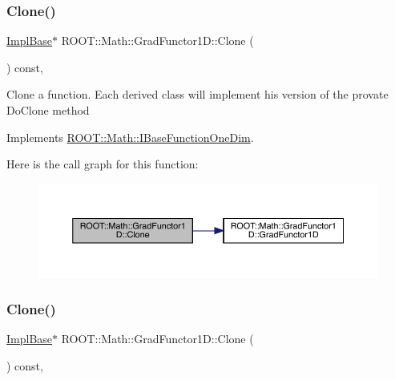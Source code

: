 \subsubsection{\texorpdfstring{Clone()}{Clone()}\hspace{0.1cm}{\footnotesize\ttfamily [1/3]}}
{\footnotesize\ttfamily \mbox{\hyperlink{classROOT_1_1Math_1_1GradFunctor1D_a16b436a0d100aa6c16ee66961c4f5b97}{Impl\+Base}}$\ast$ R\+O\+O\+T\+::\+Math\+::\+Grad\+Functor1\+D\+::\+Clone (\begin{DoxyParamCaption}{ }\end{DoxyParamCaption}) const\hspace{0.3cm}{\ttfamily [inline]}, {\ttfamily [virtual]}}

Clone a function. Each derived class will implement his version of the provate Do\+Clone method 

Implements \mbox{\hyperlink{classROOT_1_1Math_1_1IBaseFunctionOneDim_a656dbb4dfc43e8d1566442bfb1a717fd}{R\+O\+O\+T\+::\+Math\+::\+I\+Base\+Function\+One\+Dim}}.

Here is the call graph for this function\+:
\nopagebreak
\begin{figure}[H]
\begin{center}
\leavevmode
\includegraphics[width=350pt]{d3/d76/classROOT_1_1Math_1_1GradFunctor1D_ab8280aaf240a374fb7a67808d858af79_cgraph}
\end{center}
\end{figure}
\mbox{\label{classROOT_1_1Math_1_1GradFunctor1D_ab8280aaf240a374fb7a67808d858af79}} 
\subsubsection{\texorpdfstring{Clone()}{Clone()}\hspace{0.1cm}{\footnotesize\ttfamily [2/3]}}
{\footnotesize\ttfamily \mbox{\hyperlink{classROOT_1_1Math_1_1GradFunctor1D_a16b436a0d100aa6c16ee66961c4f5b97}{Impl\+Base}}$\ast$ R\+O\+O\+T\+::\+Math\+::\+Grad\+Functor1\+D\+::\+Clone (\begin{DoxyParamCaption}{ }\end{DoxyParamCaption}) const\hspace{0.3cm}{\ttfamily [inline]}, {\ttfamily [virtual]}}

